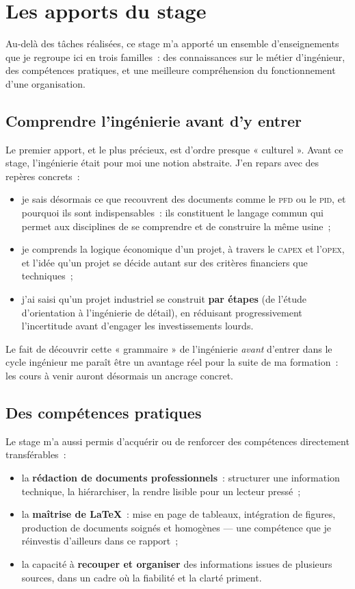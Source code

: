 \documentclass[12pt,a4paper,oneside]{report}
\newcommand{\sig}[1]{\textsc{#1}}
\begin{document}
\chapter{Les apports du stage}
\label{chap:apports}

Au-delà des tâches réalisées, ce stage m'a apporté un ensemble d'enseignements que je regroupe ici en trois familles~: des connaissances sur le métier d'ingénieur, des compétences pratiques, et une meilleure compréhension du fonctionnement d'une organisation.

\section{Comprendre l'ingénierie avant d'y entrer}

Le premier apport, et le plus précieux, est d'ordre presque « culturel ». Avant ce stage, l'ingénierie était pour moi une notion abstraite. J'en repars avec des repères concrets~:

\begin{itemize}
\item je sais désormais ce que recouvrent des documents comme le \sig{pfd} ou le \sig{pid}, et pourquoi ils sont indispensables~: ils constituent le langage commun qui permet aux disciplines de se comprendre et de construire la même usine~;
\item je comprends la logique économique d'un projet, à travers le \sig{capex} et l'\sig{opex}, et l'idée qu'un projet se décide autant sur des critères financiers que techniques~;
\item j'ai saisi qu'un projet industriel se construit \textbf{par étapes} (de l'étude d'orientation à l'ingénierie de détail), en réduisant progressivement l'incertitude avant d'engager les investissements lourds.
\end{itemize}

Le fait de découvrir cette « grammaire » de l'ingénierie \emph{avant} d'entrer dans le cycle ingénieur me paraît être un avantage réel pour la suite de ma formation~: les cours à venir auront désormais un ancrage concret.

\section{Des compétences pratiques}

Le stage m'a aussi permis d'acquérir ou de renforcer des compétences directement transférables~:

\begin{itemize}
\item la \textbf{rédaction de documents professionnels}~: structurer une information technique, la hiérarchiser, la rendre lisible pour un lecteur pressé~;
\item la \textbf{maîtrise de \LaTeX}~: mise en page de tableaux, intégration de figures, production de documents soignés et homogènes --- une compétence que je réinvestis d'ailleurs dans ce rapport~;
\item la capacité à \textbf{recouper et organiser} des informations issues de plusieurs sources, dans un cadre où la fiabilité et la clarté priment.
\end{itemize}
\end{document}
